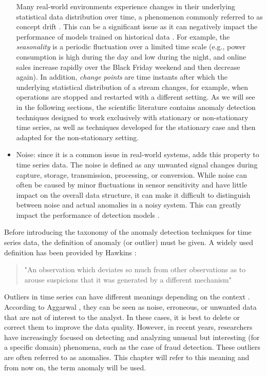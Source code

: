 \begin{itemize}
\begin{definition}
    \end{definition}    
    Many real-world environments experience changes in their underlying statistical data distribution over time, a phenomenon commonly referred to as concept drift \cite{Widmer_1994}. This can be a significant issue as it can negatively impact the performance of models trained on historical data \cite{Pan_2010}. For example, the \textit{seasonality} is a periodic fluctuation over a limited time scale (e.g., power consumption is high during the day and low during the night, and online sales increase rapidly over the Black Friday weekend and then decrease again). In addition, \textit{change points} are time instants after which the underlying statistical distribution of a stream changes, for example, when operations are stopped and restarted with a different setting. As we will see in the following sections, the scientific literature contains anomaly detection techniques designed to work exclusively with stationary or non-stationary time series, as well as techniques developed for the stationary case and then adapted for the non-stationary setting.
    \item Noise: since it is a common issue in real-world systems, \cite{Tang_2018} adds this property to time series data. The noise is defined as any unwanted signal changes during capture, storage, transmission, processing, or conversion. While noise can often be caused by minor fluctuations in sensor sensitivity and have little impact on the overall data structure, it can make it difficult to distinguish between noise and actual anomalies in a noisy system. This can greatly impact the performance of detection models \cite{Tuzlukov_2002}.
\end{itemize}
     
Before introducing the taxonomy of the anomaly detection techniques for time series data, the definition of anomaly (or outlier) must be given. A widely used definition has been provided by Hawkins \cite{hawkins1980identification}:
\begin{quote}
"An observation which deviates so much from other observations as to arouse suspicions that it was generated by a different mechanism"
\end{quote}
Outliers in time series can have different meanings depending on the context \cite{blazquez2020review}. According to Aggarwal \cite{aggarwal_2016}, they can be seen as noise, erroneous, or unwanted data that are not of interest to the analyst. In these cases, it is best to delete or correct them to improve the data quality. However, in recent years, researchers have increasingly focused on detecting and analyzing unusual but interesting (for a specific domain) phenomena, such as the case of fraud detection. These outliers are often referred to as anomalies. This chapter will refer to this meaning and from now on, the term anomaly will be used. 

